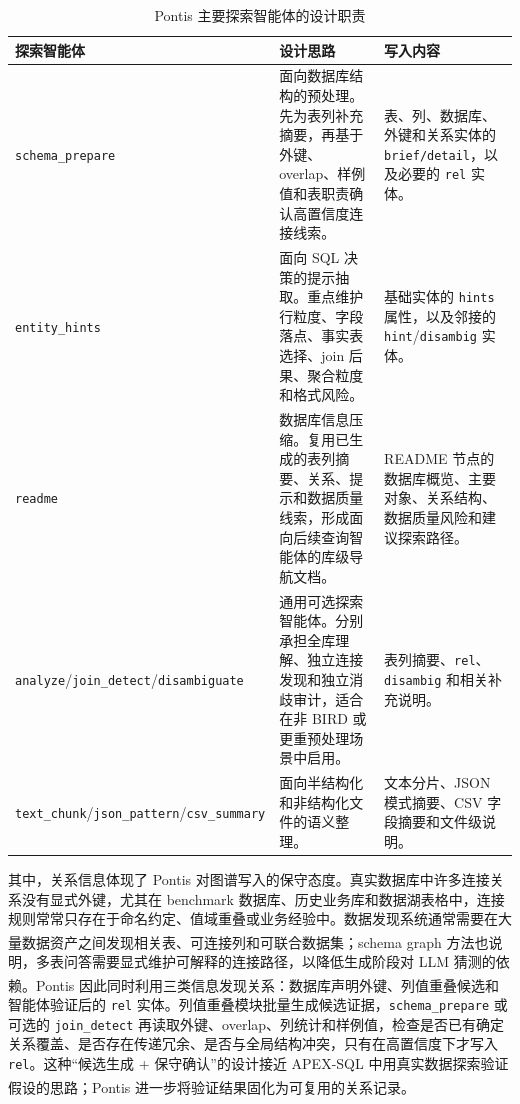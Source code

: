 \documentclass[
    bachelor,
    pdflinks,
]{xjtuthesis}
\newcommand{\upcite}[1]{\textsuperscript{\cite{#1}}}
\newcommand{\topcaption}[1]{\caption{#1}}
\begin{document}
\begin{table}[htbp]\small
  \centering
  \topcaption{Pontis 主要探索智能体的设计职责}
  \label{tab:explorers}
  \begin{tabularx}{\textwidth}{lXX}
    \toprule[1.5pt]
    \textbf{探索智能体} & \textbf{设计思路} & \textbf{写入内容} \\
    \midrule[1pt]
    \texttt{schema\_prepare} & 面向数据库结构的预处理。先为表列补充摘要，再基于外键、overlap、样例值和表职责确认高置信度连接线索。 & 表、列、数据库、外键和关系实体的 \texttt{brief/detail}，以及必要的 \texttt{rel} 实体。 \\
    \texttt{entity\_hints} & 面向 SQL 决策的提示抽取。重点维护行粒度、字段落点、事实表选择、join 后果、聚合粒度和格式风险。 & 基础实体的 \texttt{hints} 属性，以及邻接的 \texttt{hint}/\texttt{disambig} 实体。 \\
    \texttt{readme} & 数据库信息压缩。复用已生成的表列摘要、关系、提示和数据质量线索，形成面向后续查询智能体的库级导航文档。 & README 节点的数据库概览、主要对象、关系结构、数据质量风险和建议探索路径。 \\
    \texttt{analyze}/\texttt{join\_detect}/\texttt{disambiguate} & 通用可选探索智能体。分别承担全库理解、独立连接发现和独立消歧审计，适合在非 BIRD 或更重预处理场景中启用。 & 表列摘要、\texttt{rel}、\texttt{disambig} 和相关补充说明。 \\
    \texttt{text\_chunk}/\texttt{json\_pattern}/\texttt{csv\_summary} & 面向半结构化和非结构化文件的语义整理。 & 文本分片、JSON 模式摘要、CSV 字段摘要和文件级说明。 \\
    \bottomrule[1.5pt]
  \end{tabularx}
\end{table}

其中，关系信息体现了 Pontis 对图谱写入的保守态度。真实数据库中许多连接关系没有显式外键，尤其在 benchmark 数据库、历史业务库和数据湖表格中，连接规则常常只存在于命名约定、值域重叠或业务经验中。数据发现系统通常需要在大量数据资产之间发现相关表、可连接列和可联合数据集\upcite{fernandez2018aurum,fan2023starmie}；schema graph 方法也说明，多表问答需要显式维护可解释的连接路径，以降低生成阶段对 LLM 猜测的依赖\upcite{wang2025schemaGraphQA}。Pontis 因此同时利用三类信息发现关系：数据库声明外键、列值重叠候选和智能体验证后的 \texttt{rel} 实体。列值重叠模块批量生成候选证据，\texttt{schema\_prepare} 或可选的 \texttt{join\_detect} 再读取外键、overlap、列统计和样例值，检查是否已有确定关系覆盖、是否存在传递冗余、是否与全局结构冲突，只有在高置信度下才写入 \texttt{rel}。这种“候选生成 + 保守确认”的设计接近 APEX-SQL 中用真实数据探索验证假设的思路\upcite{cao2026apexsql}；Pontis 进一步将验证结果固化为可复用的关系记录。
\end{document}
